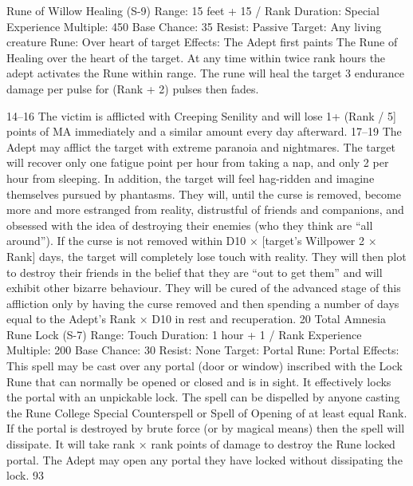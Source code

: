 \documentclass[a4paper]{article}
\begin{document}
\begin{multicols}{3}
Rune of Willow Healing (S-9)
Range: 15 feet + 15 / Rank
Duration: Special
Experience Multiple: 450
Base Chance: 35%
Resist: Passive
Target: Any living creature
Rune: Over heart of target
Effects: The Adept first paints The Rune of Healing over the heart of the target. At any time within
twice rank hours the adept activates the Rune
within range. The rune will heal the target 3 endurance damage per pulse for (Rank + 2) pulses then
fades.

14–16 The victim is afflicted with Creeping Senility and will lose 1+ (Rank / 5] points of MA immediately and a similar amount every day afterward.
17–19 The Adept may afflict the target with extreme paranoia and nightmares. The target will
recover only one fatigue point per hour from taking
a nap, and only 2 per hour from sleeping. In addition, the target will feel hag-ridden and imagine
themselves pursued by phantasms. They will, until
the curse is removed, become more and more estranged from reality, distrustful of friends and
companions, and obsessed with the idea of destroying their enemies (who they think are “all
around”). If the curse is not removed within D10 ×
[target’s Willpower 2 × Rank] days, the target will
completely lose touch with reality. They will then
plot to destroy their friends in the belief that they
are “out to get them” and will exhibit other bizarre
behaviour. They will be cured of the advanced
stage of this affliction only by having the curse
removed and then spending a number of days equal
to the Adept’s Rank × D10 in rest and recuperation.
20 Total Amnesia
Rune Lock (S-7)
Range: Touch
Duration: 1 hour + 1 / Rank
Experience Multiple: 200
Base Chance: 30%
Resist: None
Target: Portal
Rune: Portal
Effects: This spell may be cast over any portal
(door or window) inscribed with the Lock Rune
that can normally be opened or closed and is in
sight. It effectively locks the portal with an unpickable lock. The spell can be dispelled by anyone
casting the Rune College Special Counterspell or
Spell of Opening of at least equal Rank.
If the portal is destroyed by brute force (or by
magical means) then the spell will dissipate. It will
take rank × rank points of damage to destroy the
Rune locked portal.
The Adept may open any portal they have locked
without dissipating the lock.
93


\end{multicols}
\end{document}
